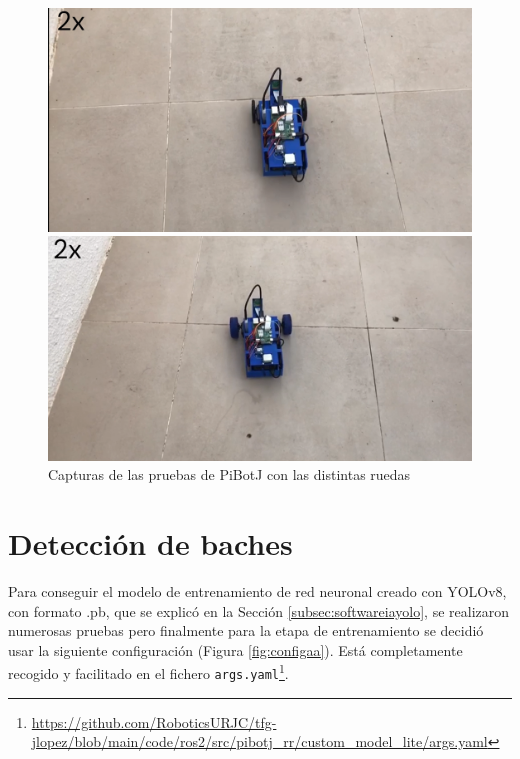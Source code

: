 \begin{figure}[ht!]
	\centering
	\begin{minipage}{0.45\linewidth}
		\centering
		\includegraphics[width=\linewidth]{figs/cap7/pruebanegra.png}
	\end{minipage}
	\hspace{1cm}
	\begin{minipage}{0.45\linewidth}
		\centering
		\includegraphics[width=\linewidth]{figs/cap7/pruebaazul.png}
	\end{minipage}
	\caption{Capturas de las pruebas de PiBotJ con las distintas ruedas}
	\label{fig:pruebaruedas}
\end{figure}


\section{Detección de baches}
\label{sec:expaa}

Para conseguir el modelo de entrenamiento de red neuronal creado con YOLOv8, con formato .pb, que se explicó en la Sección \ref{subsec:softwareiayolo}, se realizaron numerosas pruebas pero finalmente para la etapa de entrenamiento se decidió usar la siguiente configuración (Figura \ref{fig:configaa}). Está completamente recogido y facilitado en el fichero \verb|args.yaml|\footnote{\url{https://github.com/RoboticsURJC/tfg-jlopez/blob/main/code/ros2/src/pibotj_rr/custom_model_lite/args.yaml}}.

